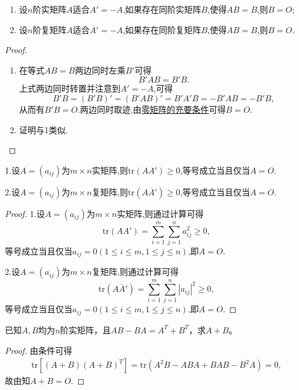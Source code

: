\documentclass[../../main.tex]{subfiles}%
\begin{document}
\begin{proposition}\label{proposition:反称/反酉矩阵为零矩阵的充要条件}
\begin{enumerate}
\item 设\(n\)阶实矩阵\(A\)适合\(A'=-A\),如果存在同阶实矩阵\(B\),使得\(AB = B\),则\(B = O\);
\item 设\(n\)阶复矩阵\(A\)适合\(\overline{A}'=-A\),如果存在同阶复矩阵\(B\),使得\(AB = B\),则\(B = O\).
\end{enumerate}
\end{proposition}
\begin{proof}
\begin{enumerate}
\item 在等式\(AB = B\)两边同时左乘\(B'\)可得
\[
B'AB = B'B.
\]
上式两边同时转置并注意到\(A'=-A\),可得
\[
B'B=(B'B)'=(B'AB)'=B'A'B=-B'AB=-B'B,
\]
从而有\(B'B = O\).两边同时取迹,由\hyperref[proposition:零矩阵的充要条件]{零矩阵的充要条件}可得\(B = O\).
\item 证明与1类似.
\end{enumerate}

\end{proof}

\begin{proposition}\label{proposition:矩阵与其转置乘积的迹}
1.设\(A=(a_{ij})\)为\(m\times n\)实矩阵,则\(\mathrm{tr}(AA')\geqslant 0\),等号成立当且仅当\(A = O\).

2.设\(A=(a_{ij})\)为\(m\times n\)复矩阵,则\(\mathrm{tr}(A\overline{A}')\geqslant 0\),等号成立当且仅当\(A = O\).
\end{proposition}
\begin{proof}

1.设\(A=(a_{ij})\)为\(m\times n\)实矩阵,则通过计算可得
\[
\mathrm{tr}(AA')=\sum_{i = 1}^{m}\sum_{j = 1}^{n}a_{ij}^2\geqslant 0,
\]
等号成立当且仅当\(a_{ij}=0(1\leqslant  i\leqslant  m,1\leqslant  j\leqslant  n)\),即\(A = O\).

2.设\(A=(a_{ij})\)为\(m\times n\)复矩阵,则通过计算可得
\[
\mathrm{tr}(A\overline{A}')=\sum_{i = 1}^{m}\sum_{j = 1}^{n}|a_{ij}|^2\geqslant 0,
\]
等号成立当且仅当\(a_{ij}=0(1\leqslant  i\leqslant  m,1\leqslant  j\leqslant  n)\),即\(A = O\).

\end{proof}

\begin{example}
已知\( A,B \)均为\( n \)阶实矩阵，且\( AB - BA = A^{T} + B^{T} \)，求\( A + B \)。
\end{example}
\begin{proof}

由条件可得
\begin{align*}
\mathrm{tr}\left[ \left( A+B \right) \left( A+B \right) ^T \right] =\mathrm{tr}\left( A^2B-ABA+BAB-B^2A \right) =0,
\end{align*}
故由知$A+B=O.$

\end{proof}
\end{document}
